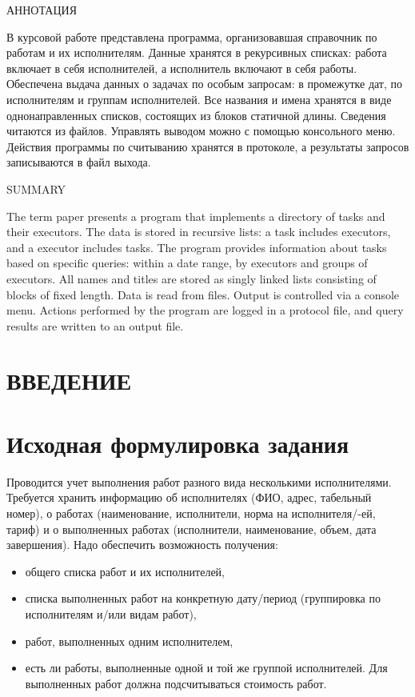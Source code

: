 \documentclass[12pt,a4paper]{extarticle}
\begin{document}
\newpage

\begin{center}
    АННОТАЦИЯ
\end{center}

В курсовой работе представлена программа, организовавшая справочник по работам и их
исполнителям. Данные хранятся в рекурсивных списках: работа включает в себя исполнителей,
а исполнитель включают в себя работы. Обеспечена выдача данных о задачах по особым запросам:
в промежутке дат, по исполнителям и группам исполнителей. Все названия и имена хранятся в виде
однонаправленных списков, состоящих из блоков статичной длины. Сведения читаются из файлов.
Управлять выводом можно с помощью консольного меню. Действия программы по считыванию хранятся в
протоколе, а результаты запросов записываются в файл выхода.

\begin{center}
    SUMMARY
\end{center}

The term paper presents a program that implements a directory of tasks and their executors.
The data is stored in recursive lists: a task includes executors, and a executor includes tasks.
The program provides information about tasks based on specific queries: within a date range, by executors
and groups of executors. All names and titles are stored as singly linked lists consisting of blocks
of fixed length. Data is read from files. Output is controlled via a console menu. Actions performed
by the program are logged in a protocol file, and query results are written to an output file.

\newpage
\tableofcontents
\newpage

\section*{ВВЕДЕНИЕ}
\section{Исходная формулировка задания}
Проводится учет выполнения работ разного вида несколькими
исполнителями. Требуется хранить информацию об исполнителях (ФИО, адрес,
табельный номер), о работах (наименование, исполнители, норма на
исполнителя/-ей, тариф) и о выполненных работах (исполнители, наименование,
объем, дата завершения). Надо обеспечить возможность получения:
\begin{itemize}
    \item общего списка работ и их исполнителей,
    \item списка выполненных работ на конкретную дату/период (группировка по
    исполнителям и/или видам работ),
    \item работ, выполненных одним исполнителем,
    \item есть ли работы, выполненные одной и той же группой исполнителей.
    Для выполненных работ должна подсчитываться стоимость работ.
\end{itemize}
\end{document}
